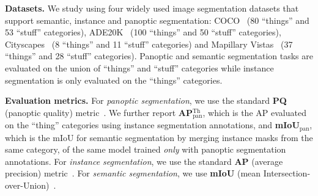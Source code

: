 \begin{table}[t]
   \caption{\textbf{Panoptic segmentation on COCO panoptic \texttt{val2017} with 133 categories.} \modelname consistently outperforms MaskFormer~\cite{cheng2021maskformer} by a large margin with different backbones on all metrics. Our best model outperforms prior state-of-the-art MaskFormer by $5.1$ PQ and K-Net~\cite{zhang2021knet} by $3.2$ PQ.
Backbones pre-trained on ImageNet-22K are marked with $^{\text{\textdagger}}$.
}
\vspace{-3mm}

\label{tab:panseg:coco}
\end{table}

\noindent\textbf{Datasets.}
We study \modelname %
using four widely used image segmentation datasets that support semantic, instance and panoptic segmentation:
COCO~\cite{lin2014coco} (80 ``things'' and 53 ``stuff'' categories), ADE20K~\cite{zhou2017ade20k} (100 ``things'' and 50 ``stuff'' categories), Cityscapes~\cite{Cordts2016Cityscapes} (8 ``things'' and 11 ``stuff'' categories) and Mapillary Vistas~\cite{neuhold2017mapillary} (37 ``things'' and 28 ``stuff'' categories). Panoptic and semantic segmentation tasks are evaluated on the union of ``things'' and ``stuff'' categories while instance segmentation is only evaluated on the ``things'' categories.

\noindent\textbf{Evaluation metrics.}
For \emph{panoptic segmentation}, we use the standard \textbf{PQ} (panoptic quality) metric~\cite{kirillov2017panoptic}. We further report \textbf{AP$^\text{Th}_\text{pan}$}, which is the AP evaluated on the ``thing'' categories using instance segmentation annotations, and \textbf{mIoU$_\text{pan}$}, which is the mIoU for semantic segmentation by merging instance masks from the same category, of the same model trained \emph{only} with panoptic segmentation annotations. For \emph{instance segmentation}, we use the standard \textbf{AP} (average precision) metric~\cite{lin2014coco}. For \emph{semantic segmentation}, we use \textbf{mIoU} (mean Intersection-over-Union)~\cite{everingham2015pascal}.



